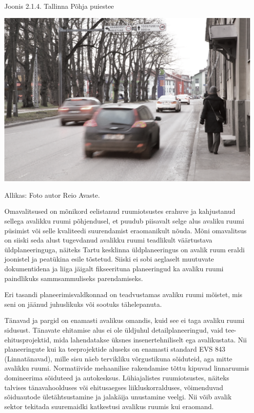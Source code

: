 \documentclass[estonian,]{article}
\begin{document}
{Joonis 2.1.4.} Tallinna Põhja puiestee

\begin{center}\includegraphics[width=0.9\linewidth]{figures/2-chapter/fig214} \end{center}

\begin{imgsource}
{Allikas:} Foto autor Reio Avaste.
\end{imgsource}

Omavalitsused on mõnikord eelistanud ruumiotsustes erahuve ja kahjustanud sellega avalikku ruumi põhjendusel, et puudub piisavalt selge alus avaliku ruumi püsimist või selle kvaliteedi suurendamist eraomanikult nõuda. Mõni omavalitsus on siiski seda alust tugevdanud avalikku ruumi teadlikult väärtustava üldplaneeringuga, näiteks Tartu kesklinna üldplaneeringus on avalik ruum eraldi joonistel ja peatükina esile tõstetud. Siiski ei sobi aeglaselt muutuvate dokumentidena ja liiga jäigalt fikseerituna planeeringud ka avaliku ruumi paindlikuks sammsammuliseks parendamiseks.

\begin{blockquote-right}
Eri tasandi planeerimisvaldkonnad on teadvustamas avaliku ruumi mõistet,
mis seni on jäänud juhuslikuks või sootuks tähelepanuta.
\end{blockquote-right}

Tänavad ja pargid on enamasti avalikus omandis, kuid see ei taga avaliku ruumi sidusust. Tänavate ehitamise alus ei ole üldjuhul detailplaneeringud, vaid tee-ehitusprojektid, mida lahendatakse üksnes insenertehniliselt ega avalikustata. Nii planeeringute kui ka teeprojektide aluseks on enamasti standard EVS 843 (Linnatänavad), mille sisu näeb tervikliku võrgustikuna sõiduteid, aga mitte avalikku ruumi. Normatiivide mehaanilise rakendamise tõttu kipuvad linnaruumis domineerima sõiduteed ja autokesksus. Lühiajalistes ruumiotsustes, näiteks talvises tänavahoolduses või ehitusaegses liikluskorralduses, võimenduvad sõiduautode ületähtsustamine ja jalakäija unustamine veelgi. Nii võib avalik sektor tekitada suuremaidki katkestusi avalikus ruumis kui eraomand.
\end{document}
